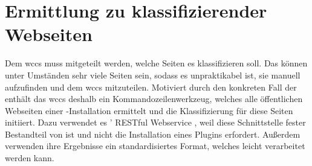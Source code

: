 \section{Ermittlung zu klassifizierender Webseiten}
    \label{section:conceptCrawler}
    Dem \gls{wccs} muss mitgeteilt werden, welche Seiten es klassifizieren soll.
    Das können unter Umständen sehr viele Seiten sein,
    sodass es unpraktikabel ist, sie manuell aufzufinden
    und dem \gls{wccs} mitzuteilen.
    Motiviert durch den konkreten Fall der {\fernUni} enthält das \gls{wccs}
    deshalb ein Kommandozeilenwerkzeug, welches alle öffentlichen Webseiten einer
    {\wordpress}-Installation ermittelt und die Klassifizierung für diese Seiten initiiert.
    Dazu verwendet es {\wordpress}' RESTful Webservice \cite[Kapitel "`REST API Handbook"']{wordpress:codex},
    weil diese Schnittstelle fester Bestandteil von {\wordpress} ist und nicht die
    Installation eines Plugins erfordert.
    Außerdem verwenden ihre Ergebnisse ein standardisiertes Format,
    welches leicht verarbeitet werden kann.
